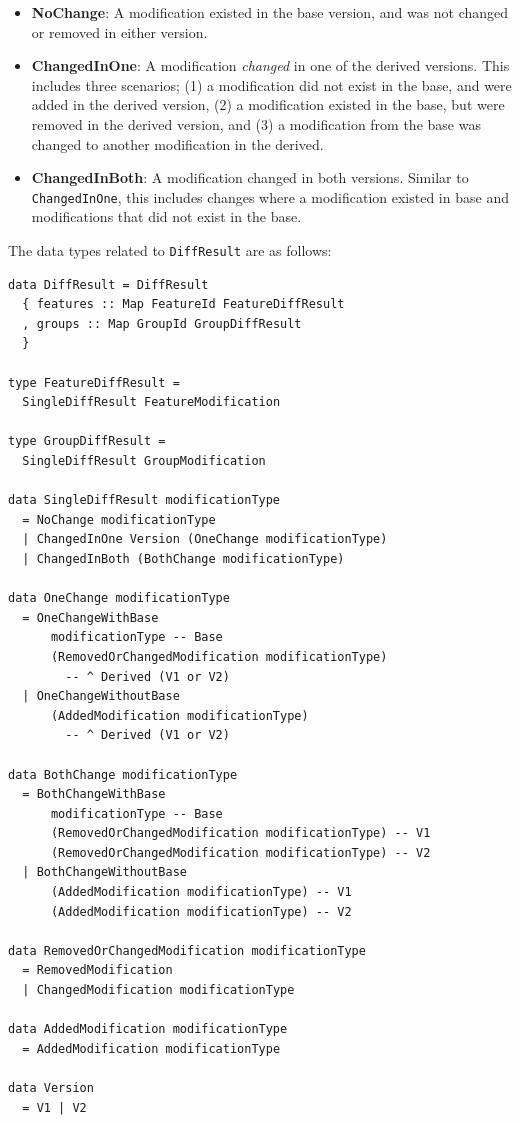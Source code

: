 \documentclass[a4paper,english]{ifimaster}
\begin{document}
\begin{itemize}
  \item \textbf{NoChange}: A modification existed in the base version, and was not changed or removed in either version.
  \item \textbf{ChangedInOne}: A modification \textit{changed} in one of the derived versions. This includes three scenarios; (1) a modification did not exist in the base, and were added in the derived version, (2) a modification existed in the base, but were removed in the derived version, and (3) a modification from the base was changed to another modification in the derived.
  \item \textbf{ChangedInBoth}: A modification changed in both versions. Similar to \texttt{ChangedInOne}, this includes changes where a modification existed in base and modifications that did not exist in the base.
\end{itemize}

The data types related to \texttt{DiffResult} are as follows:

\begin{verbatim}
data DiffResult = DiffResult
  { features :: Map FeatureId FeatureDiffResult
  , groups :: Map GroupId GroupDiffResult
  }

type FeatureDiffResult =
  SingleDiffResult FeatureModification

type GroupDiffResult =
  SingleDiffResult GroupModification

data SingleDiffResult modificationType
  = NoChange modificationType
  | ChangedInOne Version (OneChange modificationType)
  | ChangedInBoth (BothChange modificationType)

data OneChange modificationType
  = OneChangeWithBase
      modificationType -- Base
      (RemovedOrChangedModification modificationType)
        -- ^ Derived (V1 or V2)
  | OneChangeWithoutBase
      (AddedModification modificationType) 
        -- ^ Derived (V1 or V2)

data BothChange modificationType
  = BothChangeWithBase
      modificationType -- Base
      (RemovedOrChangedModification modificationType) -- V1
      (RemovedOrChangedModification modificationType) -- V2
  | BothChangeWithoutBase
      (AddedModification modificationType) -- V1
      (AddedModification modificationType) -- V2

data RemovedOrChangedModification modificationType
  = RemovedModification
  | ChangedModification modificationType

data AddedModification modificationType
  = AddedModification modificationType

data Version
  = V1 | V2
\end{verbatim}
\end{document}

